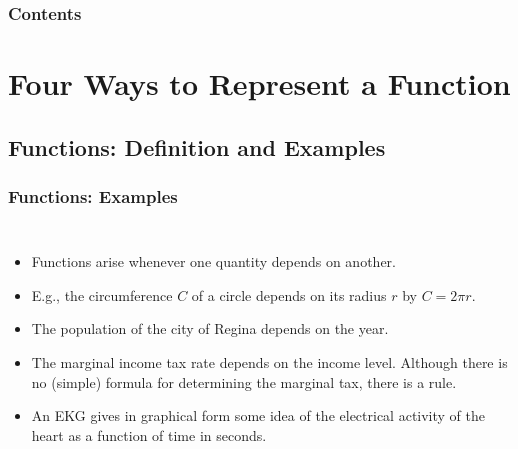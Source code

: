 \documentclass[serif,ignorenonframetext]{beamer}
\title{\commonTitleZeroOneOne}
\subtitle{\commonSubtitleZeroOneOne}
\author{\commonAuthor}
\institute{\commonInstitute}
\date{\commonDateZeroOneOne}
\begin{document}

\begin{frame}
  \titlepage
\end{frame}

\begin{frame}
  \frametitle{Contents}
  \tableofcontents
\end{frame}


\section{Four Ways to Represent a Function}

\subsection{Functions: Definition and Examples}

\begin{frame}
  \frametitle{Functions: Examples}
  \begin{columns}
  \begin{itemize}[<+->]
  \item Functions arise whenever one quantity depends on another.
  \item E.g., the circumference $C$ of a circle depends on its
    radius $r$ by $C=2\pi r$.
  \item The population of the city of Regina depends on the year.
  \item The marginal income tax rate depends on the
    income level.  Although there is no (simple) formula for
    determining the marginal tax, there is a rule.
  \item An EKG gives in graphical form some idea of the electrical
    activity of the heart as a function of time in seconds.
  \end{itemize}
  \end{columns}
\end{frame}
\end{document}
